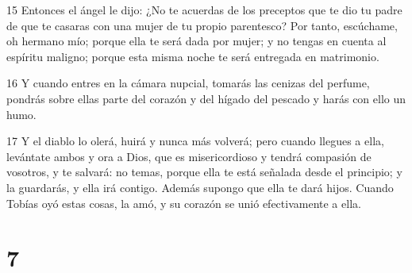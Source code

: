 \par 15 Entonces el ángel le dijo: ¿No te acuerdas de los preceptos que te dio tu padre de que te casaras con una mujer de tu propio parentesco? Por tanto, escúchame, oh hermano mío; porque ella te será dada por mujer; y no tengas en cuenta al espíritu maligno; porque esta misma noche te será entregada en matrimonio.
\par 16 Y cuando entres en la cámara nupcial, tomarás las cenizas del perfume, pondrás sobre ellas parte del corazón y del hígado del pescado y harás con ello un humo.
\par 17 Y el diablo lo olerá, huirá y nunca más volverá; pero cuando llegues a ella, levántate ambos y ora a Dios, que es misericordioso y tendrá compasión de vosotros, y te salvará: no temas, porque ella te está señalada desde el principio; y la guardarás, y ella irá contigo. Además supongo que ella te dará hijos. Cuando Tobías oyó estas cosas, la amó, y su corazón se unió efectivamente a ella.

\chapter{7}

